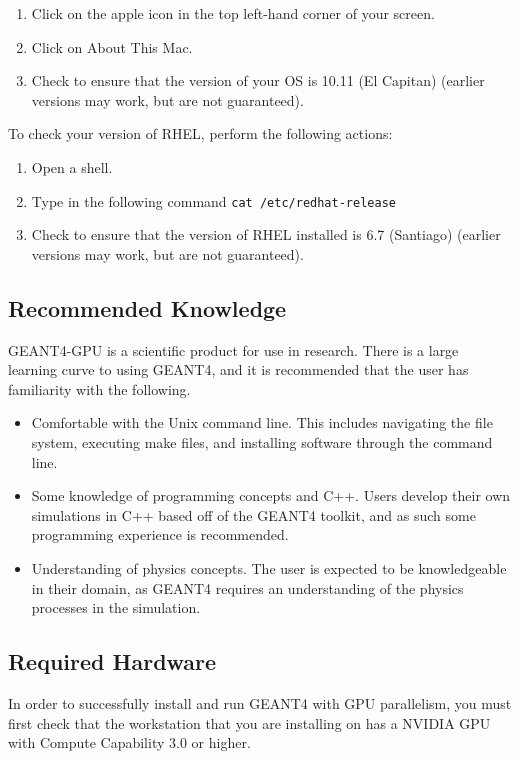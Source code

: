 \documentclass[12pt]{article}
\begin{document}
\begin{enumerate}
\item Click on the apple icon in the top left-hand corner of your screen.
\item Click on About This Mac.
\item Check to ensure that the version of your OS is 10.11 (El Capitan) (earlier versions may work, but are not guaranteed).
\end{enumerate}

To check your version of RHEL, perform the following actions:
\begin{enumerate}
\item Open a shell.
\item Type in the following command \texttt{cat /etc/redhat-release}
\item Check to ensure that the version of RHEL installed is 6.7 (Santiago) (earlier versions may work, but are not guaranteed).
\end{enumerate}

\subsection{Recommended Knowledge} %
GEANT4-GPU is a scientific product for use in research. There is a large learning curve to using GEANT4, and it is recommended that the user has familiarity with the following.
\begin{itemize}
\item Comfortable with the Unix command line. This includes navigating the file system, executing make files, and installing software through the command line.
\item Some knowledge of programming concepts and C++. Users develop their own simulations in C++ based off of the GEANT4 toolkit, and as such some programming experience is recommended.
\item Understanding of physics concepts. The user is expected to be knowledgeable in their domain, as GEANT4 requires an understanding of the physics processes in the simulation.
\end{itemize}

\subsection{Required Hardware} \label{SecCardReqs}%
In order to successfully install and run GEANT4 with GPU parallelism, you must first check that the workstation that you are installing on has a NVIDIA GPU with Compute Capability 3.0 or higher.\\
\end{document}
